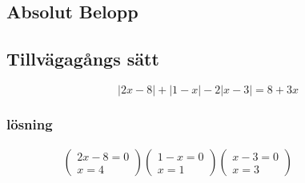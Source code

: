 \begin{multicols}{2}
\newpage
\section{Absolut Belopp}
\subsection{Tillvägagångs sätt}
\begin{equation}
| 2 x - 8 | + | 1 - x | - 2 | x - 3 | = 8 + 3 x
\end{equation}


\subsubsection{lösning}
\begin{align*}
\left( \begin{array} { c } { 2 x - 8 = 0 } \\ { x = 4 } \end{array} \right)
\left( \begin{array} { c } { 1 - x = 0 } \\ { x = 1 } \end{array} \right)
\left( \begin{array} { c } { x - 3 = 0 } \\ { x = 3 } \end{array} \right)
&\quad
&\quad
&\quad
\end{align*}


\end{multicols}

